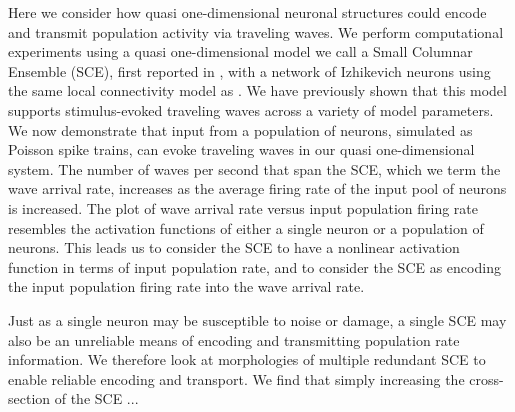 \documentclass[12pt]{article}
\begin{document}
Here we consider how quasi one-dimensional neuronal structures could encode and transmit population activity via traveling waves.
We perform computational experiments using a quasi one-dimensional model we call a Small Columnar Ensemble (SCE), first reported in , with a network of Izhikevich neurons \parencite{izhikevich2003} using the same local connectivity model as \parencite{maass2002}.
We have previously shown that this model supports stimulus-evoked traveling waves across a variety of model parameters.
We now demonstrate that input from a population of neurons, simulated as Poisson spike trains, can evoke traveling waves in our quasi one-dimensional system.
The number of waves per second that span the SCE, which we term the wave arrival rate, increases as the average firing rate of the input pool of neurons is increased.
The plot of wave arrival rate versus input population firing rate resembles the activation functions of either a single neuron or a population of neurons.
This leads us to consider the SCE to have a nonlinear activation function in terms of input population rate, and to consider the SCE as encoding the input population firing rate into the wave arrival rate.

Just as a single neuron may be susceptible to noise or damage, a single SCE may also be an unreliable means of encoding and transmitting population rate information.
We therefore look at morphologies of multiple redundant SCE to enable reliable encoding and transport.
We find that simply increasing the cross-section of the SCE ...
\end{document}
